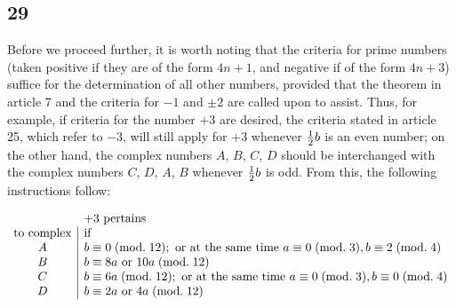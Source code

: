 \documentclass[twoside,12pt, showframe]{memoir}
\renewcommand{\pmod}[1]{\;(\textrm{mod.}\;#1)}
\let\oldfrac\frac
\def\frac#1#2{\mathchoice{\tfrac{#1}{#2}}{\oldfrac{#1}{#2}}{\genfrac{}{}{}{2}{#1}{#2\mathstrut}}{\genfrac{}{}{}{3}{#1}{#2\mathstrut}}}
\begin{document}
\subsection*{29}
Before we proceed further, it is worth noting that the criteria for prime numbers (taken positive if they are of the form \(4n+1\), and negative if of the form \(4n+3\)) suffice for the determination of all other numbers, provided that the theorem in article 7 and the criteria for \(-1\) and \(\pm 2\) are called upon to assist. Thus, for example, if criteria for the number \(+3\) are desired, the criteria stated in article 25, which refer to \(-3\), will still apply for \(+3\) whenever \(\frac{1}{2}b\) is an even number; on the other hand, the complex numbers \(A\), \(B\), \(C\), \(D\) should be interchanged with the complex numbers \(C\), \(D\), \(A\), \(B\) whenever \(\frac{1}{2}b\) is odd. From this, the following instructions follow:

\(\begin{array}{c|l}
\multicolumn{1}{c}{}&\multicolumn{1}{l}{+3\text{ pertains}}\\
\text{to complex}&\text{if}\\
A & b \equiv 0\pmod{12}; \text{ or at the same time } a \equiv 0\pmod{3}, b \equiv 2\pmod{4} \\
B & b \equiv 8 a \text{ or } 10 a\pmod{12} \\
C & b \equiv 6 a\pmod{12}; \text{ or at the same time } a \equiv 0\pmod{3}, b \equiv 0\pmod{4} \\
D & b \equiv 2 a \text{ or } 4 a\pmod{12}
\end{array}\)
%
\end{document}
